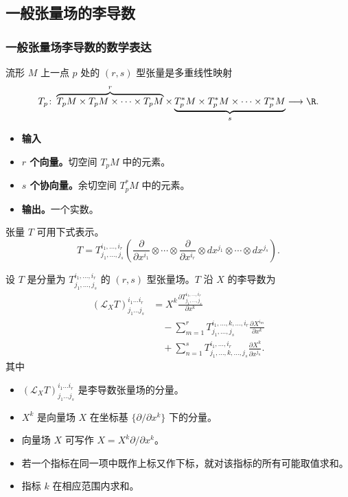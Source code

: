 \subsection{一般张量场的李导数}
\subsubsection{一般张量场李导数的数学表达}
流形 $M$ 上一点 $p$ 处的 $(r,s)$ 型张量是多重线性映射
\[
  T_p\colon
    \overbrace{T_pM\times T_pM\times\cdots\times T_pM}^{r}
    \times\underbrace{T_p^*M\times T_p^*M\times\cdots\times T_p^*M}_{s}
    \longrightarrow\R.
\]
\begin{itemize}
  \item \textbf{输入}
  \item \textbf{$r$ 个向量。}切空间 $T_pM$ 中的元素。
  \item \textbf{$s$ 个协向量。}余切空间 $T_p^*M$ 中的元素。
  \item \textbf{输出。}一个实数。
\end{itemize}
张量 $T$ 可用下式表示。
\[
  T=T^{i_1,\ldots,i_r}_{j_1,\ldots,j_s}
      \left(\frac{\partial}{\partial x^{i_1}}\otimes\cdots\otimes
        \frac{\partial}{\partial x^{i_r}}\otimes dx^{j_1}\otimes
        \cdots\otimes dx^{j_s}\right).
\]

设 $T$ 是分量为 $T^{i_1,\ldots,i_r}_{j_1,\ldots,j_s}$ 的 $(r,s)$ 型张量场。$T$ 沿 $X$ 的李导数为
\[
  \begin{aligned}
  (\mathcal L_X T)^{i_1\ldots i_r}_{j_1\ldots j_s}
    &=X^k\frac{\partial T^{i_1,\ldots,i_r}_{j_1,\ldots,j_s}}{\partial x^k}\\
    &\quad-\sum_{m=1}^{r}T^{i_1,\ldots,k,\ldots,i_r}_{j_1,\ldots,j_s}
                   \frac{\partial X^{i_m}}{\partial x^k}\\
    &\quad+\sum_{n=1}^{s}T^{i_1,\ldots,i_r}_{j_1,\ldots,k,\ldots,j_s}
                   \frac{\partial X^k}{\partial x^{j_n}}.
  \end{aligned}
\]
其中
\begin{itemize}
  \item $(\mathcal L_X T)^{i_1\ldots i_r}_{j_1\ldots j_s}$ 是李导数张量场的分量。
  \item $X^k$ 是向量场 $X$ 在坐标基 $\{\partial/\partial x^k\}$ 下的分量。
  \item 向量场 $X$ 可写作 $X=X^k\partial/\partial x^k$。
  \item 若一个指标在同一项中既作上标又作下标，就对该指标的所有可能取值求和。
  \item 指标 $k$ 在相应范围内求和。
\end{itemize}

